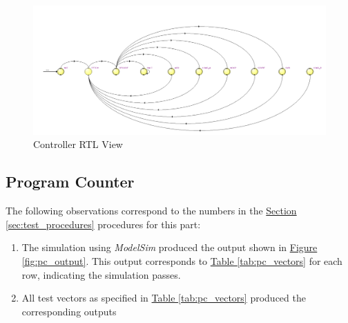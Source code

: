 \begin{figure}
    \includegraphics[width=\textwidth]{images/controller_rtl.png}
    \caption{Controller RTL View\label{fig:controller_rtl}}
\end{figure}


\subsection{Program Counter} %
\label{sub:program_counter}

The following observations correspond to the numbers in the \hyperref[sec:test_procedures]{Section \ref*{sec:test_procedures}} procedures for this part:

\begin{enumerate}
    \item The simulation using \emph{ModelSim} produced the output shown in \hyperref[fig:pc_output]{Figure \ref*{fig:pc_output}}.
    This output corresponds to \hyperref[tab:pc_vectors]{Table \ref*{tab:pc_vectors}} for each row, indicating the simulation passes.
    \item All test vectors as specified in \hyperref[tab:pc_vectors]{Table \ref*{tab:pc_vectors}} produced the corresponding outputs
\end{enumerate}

